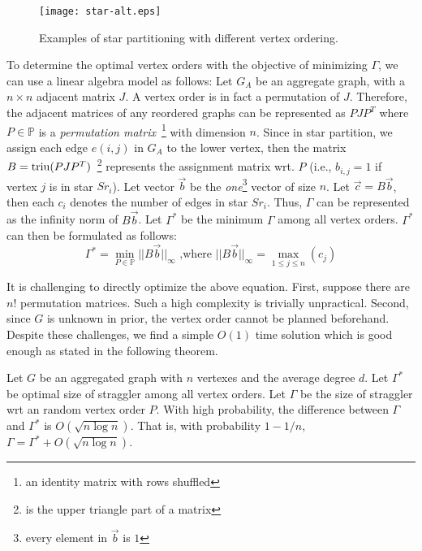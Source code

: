 \begin{figure}[h]
\centering
\texttt{[image: star-alt.eps]}
\caption{Examples of star partitioning with different vertex ordering.}
\label{fig:star-alt}
\end{figure}


To determine the optimal vertex orders with the objective of minimizing $\Gamma$, 
we can use a linear algebra model as follows:  
Let $G_A$ be an aggregate graph, with a $n \times n$ adjacent matrix $J$.
A vertex order is in fact a permutation of $J$. Therefore,
the adjacent matrices of any reordered graphs can be represented as $PJP^T$
where $P \in \mathbb{P}$ is a 
\emph{permutation matrix}~\footnote{an identity matrix with rows shuffled} with dimension $n$.
Since in star partition, we assign each edge $e(i,j)$ in $G_A$ to the lower vertex, 
then the matrix $B=\operatorname*{triu}(PJP^T)$~\footnote{ is the upper triangle part of a matrix}
represents the assignment matrix wrt. $P$ (i.e., $b_{i,j} = 1$ if vertex $j$ is in star $Sr_i$).
Let vector $\vec{b}$ be the \textit{one}\footnote{every element in $\vec{b}$ is $1$} 
vector of size $n$. Let $\vec{c} = B\vec{b}$, then each $c_i$ 
denotes the number of edges in star $Sr_i$. Thus, $\Gamma$ can be represented
as the infinity norm of $B\vec{b}$. Let $\Gamma^*$ be the minimum $\Gamma$ among all vertex orders. 
$\Gamma^*$ can then be formulated as follows:
\begin{equation}
\Gamma^* = \min_{P \in \mathbb{P}}{||B\vec{b}||_\infty} \text{ ,where } ||B\vec{b}||_\infty = \max_{1\leq j \leq n}(c_j)
\end{equation}

It is challenging to directly optimize the above equation. 
First, suppose there are $n!$ permutation matrices. 
Such a high complexity is trivially unpractical. Second,
since $G$ is unknown in prior,
the vertex order cannot be planned beforehand. 
Despite these challenges, we find a simple $O(1)$ time 
solution which is good enough as stated in the 
following theorem.

\begin{theorem}
\label{THM:SPM_LB}
Let $G$ be an aggregated graph with $n$ vertexes and the average degree $d$.
Let $\Gamma^*$ be optimal size of straggler among all vertex orders.
Let $\Gamma$ be the size of straggler wrt an random vertex order $P$. 
With high probability, the difference between $\Gamma$ and $\Gamma^*$ is $O(\sqrt{n \log n})$.
That is,  with probability $1-1/n$, 
$\Gamma = \Gamma^* + O(\sqrt{n \log n})$.
\end{theorem}

